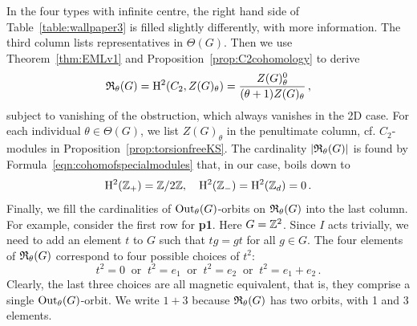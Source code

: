 In the four types with infinite centre, the right hand side of Table~\ref{table:wallpaper3}
is filled slightly differently, with more information. The third column lists representatives in $\Theta(G)$. 
Then we use Theorem~\ref{thm:EMLv1} and Proposition~\ref{prop:C2cohomology} to derive
\[ {\mathfrak R}_{\theta}(G) =
\mathrm{H}^{2}(C_2, Z(G)_{\theta}) =
\dfrac{Z(G)^0_{\theta}}{(\theta + 1)Z(G)_{\theta}} \, , \]
subject to vanishing of the obstruction, which always vanishes in the 2D case.
For each individual $\theta \in \Theta (G)$, we list $Z(G)_{\theta}$ in the penultimate column, cf. $C_2$-modules in Proposition~\ref{prop:torsionfreeKS}.
The cardinality $|{\mathfrak R}_{\theta}(G)|$ is found by Formula~\eqref{eqn:cohomofspecialmodules} that, in our case, boils down to
  \begin{equation}
  \mathrm{H}^{2}({\mathbb Z}_+) = {\mathbb Z}/2{\mathbb Z}, \quad
  \mathrm{H}^{2}({\mathbb Z}_-) =
  \mathrm{H}^{2}({\mathbb Z}_d) = 0 \, .
  \end{equation}
  Finally, we fill the cardinalities of $\operatorname{Out}_\theta (G)$-orbits on ${\mathfrak R}_{\theta}(G)$ into the last column.
  For example, consider the first row for {\bfseries p1}. Here $G={\mathbb Z}^2$. Since $I$ acts trivially, we need to add an element $t$ to $G$
  such that $tg=gt$ for all $g\in G$. The four elements of ${\mathfrak R}_{\theta}(G)$ correspond to four possible choices of $t^2$:
  \[ t^2 = 0 \ \mbox{ or } \ t^2 = e_1 \ \mbox{ or } \ t^2 = e_2 \ \mbox{ or } \ t^2 = e_1+e_2 \, . \]
  Clearly, the last three choices are all magnetic equivalent, that is, they comprise a single $\operatorname{Out}_\theta (G)$-orbit. We write $1+3$
  because ${\mathfrak R}_{\theta}(G)$ has  two orbits, with 1 and 3 elements.
